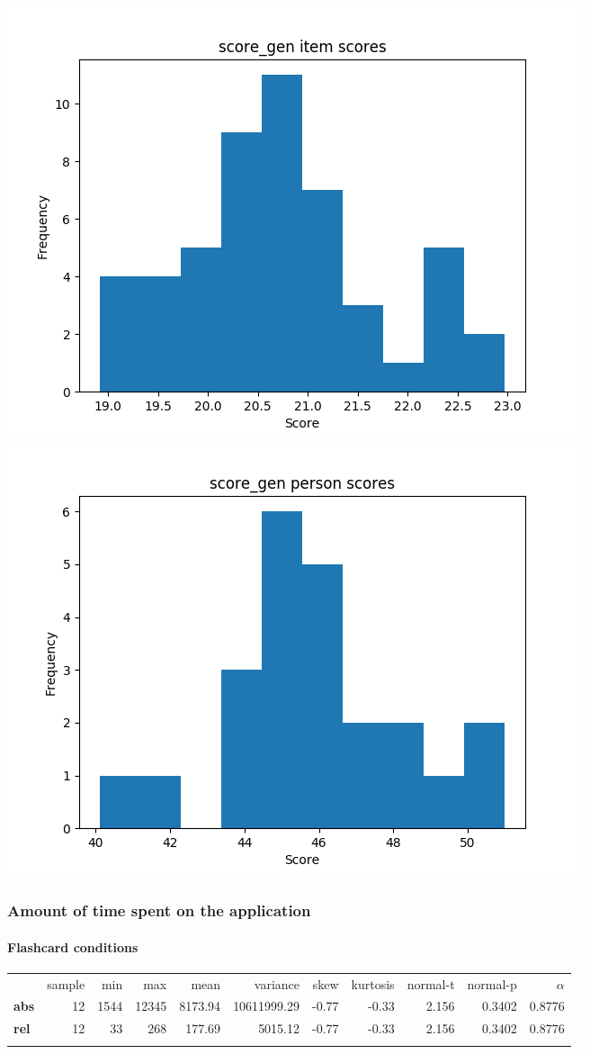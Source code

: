 \documentclass[]{article}
\begin{document}
\includegraphics{score_gen_diff.png}
\includegraphics{score_gen_abil.png}

\subsubsection{Amount of time spent on the
application}\label{amount-of-time-spent-on-the-application}

\FloatBarrier
\paragraph{Flashcard conditions}\label{flashcard-conditions-2}

\begin{longtable}[c]{@{}lrrrrrrrrrr@{}}
\toprule\addlinespace
& sample & min & max & mean & variance & skew & kurtosis & normal-t &
normal-p & $\alpha$
\\\addlinespace
\midrule\endhead
\textbf{abs} & 12 & 1544 & 12345 & 8173.94 & 10611999.29 & -0.77 & -0.33
& 2.156 & 0.3402 & 0.8776
\\\addlinespace
\textbf{rel} & 12 & 33 & 268 & 177.69 & 5015.12 & -0.77 & -0.33 & 2.156
& 0.3402 & 0.8776
\\\addlinespace
\bottomrule
\end{longtable}
\end{document}
